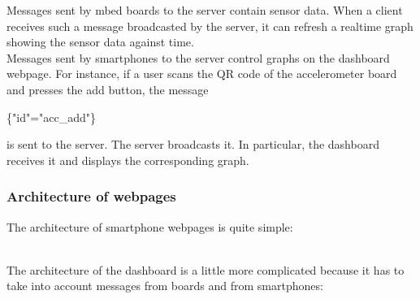 \documentclass[pdftex,10pt,a4paper]{report}
\newenvironment{packed_item}{
\begin{itemize}
  \setlength{\itemsep}{1pt}
  \setlength{\parskip}{0pt}
  \setlength{\parsep}{0pt}
}{\end{itemize}}
\begin{document}
Messages sent by mbed boards to the server contain sensor data. When a client receives such a message broadcasted by the server, it can refresh a realtime graph showing the sensor data against time. \\

Messages sent by smartphones to the server control graphs on the dashboard webpage. For instance, if a user scans the QR code of the accelerometer board and presses the add button, the message 
		\begin{center}
				\{"id"="acc\_add"\}
		\end{center}
is sent to the server. The server broadcasts it. In particular, the dashboard receives it and displays the corresponding graph. \\

\subsubsection{Architecture of webpages}
The architecture of smartphone webpages is quite simple:

 \\

The architecture of the dashboard is a little more complicated because it has to take into account messages from boards and from smartphones:
\end{document}
